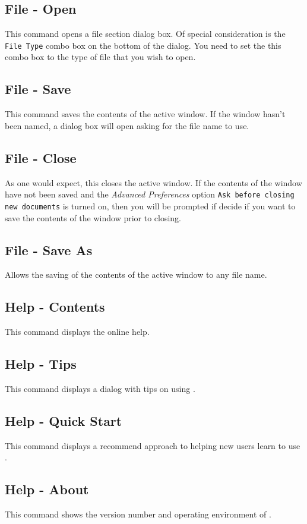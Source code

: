 \subsection{File - Open}
This command opens a file section dialog box. Of special consideration
is the \texttt{File Type} combo box on the bottom of the dialog. You need
to set the this combo box to the type of file that you wish to open.

\subsection{File - Save}
This command saves the contents of the active window. If the window hasn't
been named, a dialog box will open asking for the file name to use.

\subsection{File - Close}
As one would expect, this closes the active window. If the contents of the window have not been
saved and the \emph{Advanced Preferences} option \texttt{Ask before closing new documents}
is turned on, then you will be prompted if decide if you want to save the contents of the window
prior to closing.

\subsection{File - Save As}
Allows the saving of the contents of the active window to any file name.

\subsection{Help - Contents}
This command displays the online help.

\subsection{Help - Tips}
This command displays a dialog with tips on using \ctsim.

\subsection{Help - Quick Start}
This command displays a recommend approach to helping new users learn to use \ctsim.

\subsection{Help - About}
This command shows the version number and operating environment of \ctsim.



